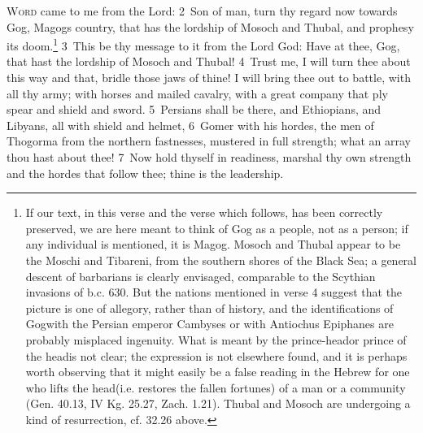 \documentclass[10pt]{book} %
\begin{document}
\lettrine[lines=2]{W}{ord} came to me from the Lord: \textcolor{benred8}{2}~Son of man, turn thy regard now towards Gog, Magog\textquotesingle s country, that has the lordship of Mosoch and Thubal, and prophesy its doom.\footnote[1]{If our text, in this verse and the verse which follows, has been correctly preserved, we are here meant to think of Gog as a people, not as a person; if any individual is mentioned, it is Magog. Mosoch and Thubal appear to be the Moschi and Tibareni, from the southern shores of the Black Sea; a general descent of barbarians is clearly envisaged, comparable to the Scythian invasions of b.c. 630. But the nations mentioned in verse 4 suggest that the picture is one of allegory, rather than of history, and the identifications of \textasciigrave Gog\textquotesingle  with the Persian emperor Cambyses or with Antiochus Epiphanes are probably misplaced ingenuity. What is meant by the \textasciigrave prince-head\textquotesingle  or \textasciigrave prince of the head\textquotesingle  is not clear; the expression is not elsewhere found, and it is perhaps worth observing that it might easily be a false reading in the Hebrew for \textasciigrave one who lifts the head\textquotesingle  (i.e. restores the fallen fortunes) of a man or a community (Gen. 40.13, IV Kg. 25.27, Zach. 1.21). Thubal and Mosoch are undergoing a kind of resurrection, cf. 32.26 above.} \textcolor{benred8}{3}~This be thy message to it from the Lord God: Have at thee, Gog, that hast the lordship of Mosoch and Thubal! \textcolor{benred8}{4}~Trust me, I will turn thee about this way and that, bridle those jaws of thine! I will bring thee out to battle, with all thy army; with horses and mailed cavalry, with a great company that ply spear and shield and sword. \textcolor{benred8}{5}~Persians shall be there, and Ethiopians, and Libyans, all with shield and helmet, \textcolor{benred8}{6}~Gomer with his hordes, the men of Thogorma from the northern fastnesses, mustered in full strength; what an array thou hast about thee! \textcolor{benred8}{7}~Now hold thyself in readiness, marshal thy own strength and the hordes that follow thee; thine is the leadership.
\end{document}
